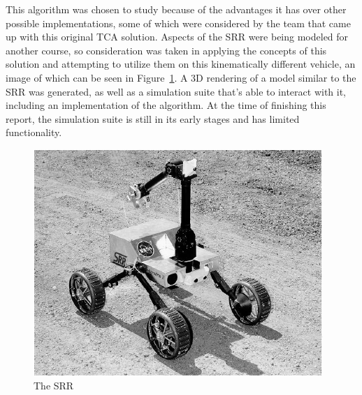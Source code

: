 This algorithm was chosen to study because of the advantages it has over other possible implementations, some of which were considered by the team that came up with this original \ac{TCA} solution. Aspects of the \ac{SRR} were being modeled for another course, so consideration was taken in applying the concepts of this solution and attempting to utilize them on this kinematically different vehicle, an image of which can be seen in Figure~\ref{traction_control:algorithms:srr}. A 3D rendering of a model similar to the \ac{SRR} was generated, as well as a simulation suite that's able to interact with it, including an implementation of the algorithm. At the time of finishing this report, the simulation suite is still in its early stages and has limited functionality.

\begin{figure}[htbp]
	\centering
	\includegraphics[width=.9\textwidth]{sections/introduction/images/srr.png}
	\caption{The \acl{SRR} \cite{srr}}
	\label{traction_control:algorithms:srr}
\end{figure}
